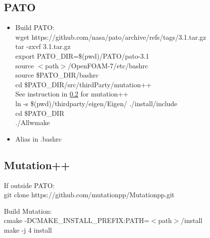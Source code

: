 \documentclass[a4paper, 12pt]{article}
\numberwithin{equation}{section}
\newcommand{\code}{\fontfamily{pcr}\selectfont}
\begin{document}
    \subsection{PATO}
        \begin{itemize}
        \item Build PATO: \\
        wget https://github.com/nasa/pato/archive/refs/tags/3.1.tar.gz \\
        tar -zxvf 3.1.tar.gz \\
        export PATO\_DIR=\$(pwd)/PATO/pato-3.1 \\
        source $<$path$>$/OpenFOAM-7/etc/bashrc \\
        source \$PATO\_DIR/bashrc \\
        cd \$PATO\_DIR/src/thirdParty/mutation++ \\
        See instruction in \ref{sec:mutation} for {\code mutation++} \\
        ln -s \$(pwd)/thirdparty/eigen/Eigen/ ./install/include \\
        cd \$PATO\_DIR \\
        ./Allwmake

        \item Alias in .bashrc
        \end{itemize}



    \subsection{Mutation++ \\}
    \label{sec:mutation}

        If outside PATO: \\
        git clone https://github.com/mutationpp/Mutationpp.git

        Build Mutation: \\
        cmake -DCMAKE\_INSTALL\_PREFIX:PATH=$<$path$>$/install \\
        make -j 4 install \\
\end{document}

